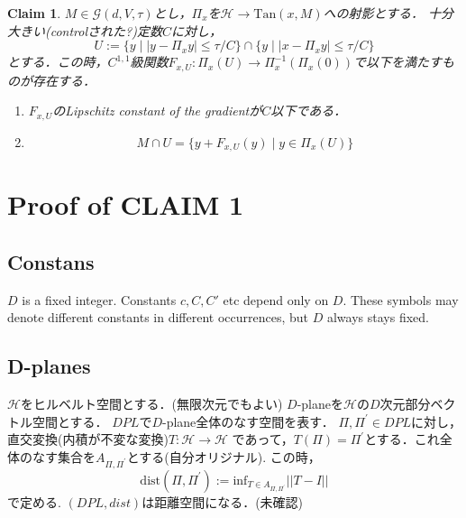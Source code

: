 \documentclass{ujarticle}
\newtheorem{clm}{Claim}
\newcommand{\gdvt}{\mathcal{G}(d,V,\tau)}
\begin{document}
\begin{clm}
  $M \in \gdvt$とし，$\Pi_x$を$\mathcal{H} \to \mathrm{Tan}(x,M)$への射影とする．
  十分大きい(controlされた?)定数$C$に対し，
  \begin{equation*}
   U:= \{ y \mid |y - \Pi_xy| \le \tau/C \} \cap \{ y \mid |x - \Pi_x y| \le \tau/C \}
  \end{equation*}
  とする．この時，$C^{1,1}$級関数$F_{x,U}:\Pi_x(U) \to \Pi_x^{-1}(\Pi_x(0))$で以下を満たすものが存在する．
  \begin{enumerate}
    \item $F_{x,U}$のLipschitz constant of the gradientが$C$以下である．
    \item \begin{equation*}
    M \cap U = \{ y + F_{x,U}(y) \mid y \in \Pi_x(U) \}
    \end{equation*}
  \end{enumerate}
\end{clm}

\section{Proof of CLAIM 1}
\label{sec:Proof of CLAIM 1}

\subsection{Constans}
\label{sub:Constans}
$D$ is a fixed integer. Constants $c,C,C\prime$ etc depend only on $D$. These symbols may denote
different constants in different occurrences, but $D$ always stays fixed.

\subsection{D-planes}
\label{sub:D-planes}
$\mathcal{H}$をヒルベルト空間とする．(無限次元でもよい)
$D$-planeを$\mathcal{H}$の$D$次元部分ベクトル空間とする．
$DPL$で$D$-plane全体のなす空間を表す．
$\Pi,\Pi^\prime \in DPL$に対し，直交変換(内積が不変な変換)$T: \mathcal{H} \to \mathcal{H}$
であって，$T(\Pi)= \Pi^\prime$とする．これ全体のなす集合を$A_{\Pi,\Pi^\prime}$とする(自分オリジナル).
この時，
\begin{equation*}
 \mathrm{dist} (\Pi,\Pi^\prime):= \mathrm{inf}_{T \in A_{\Pi,\Pi^\prime}} ||T -I||
\end{equation*}
で定める.
$(DPL,dist)$は距離空間になる．(未確認)
\end{document}
